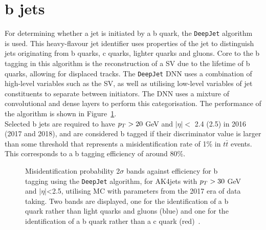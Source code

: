 \section{b jets}

For determining whether a jet is initiated by a b quark, the \texttt{DeepJet} algorithm~\cite{CMS:2017wtu,Bols:2020bkb} is used.  
This heavy-flavour jet identifier uses properties of the jet to distinguish jets originating from b quarks, c quarks, lighter quarks and gluons.
Core to the b tagging in this algorithm is the reconstruction of a \ac{SV} due to the lifetime of b quarks, allowing for displaced tracks.
The \texttt{DeepJet} \ac{DNN} uses a combination of high-level variables such as the \ac{SV}, as well as utilising low-level variables of jet constituents to separate between initiators.
The \ac{DNN} uses a mixture of convolutional and dense layers to perform this categorisation.
The performance of the algorithm is shown in Figure~\ref{fig:deepjet}. \\

Selected b jets are required to have $p_{T} > 20$ GeV and $|\eta| <$ 2.4 (2.5) in 2016 (2017 and 2018), and are considered b tagged if their discriminator value is larger than some threshold that represents a misidentification rate of 1\% in $t\bar{t}$ events.
This corresponds to a b tagging efficiency of around 80\%.

\begin{figure}[!hbtp]
\centering
\caption[Plot of the b tagging performance.]{Misidentification probability 2$\sigma$ bands against efficiency for b tagging using the \texttt{DeepJet} algorithm, for AK4jets with $p_{T}>30$ GeV and $|\eta|$<2.5, utilising MC with parameters from the 2017 era of data taking. Two bands are displayed, one for the identification of a b quark rather than light quarks and gluons (blue) and one for the identification of a b quark rather than a c quark (red)~\cite{deepjet}.}
\label{fig:deepjet}
\end{figure}

